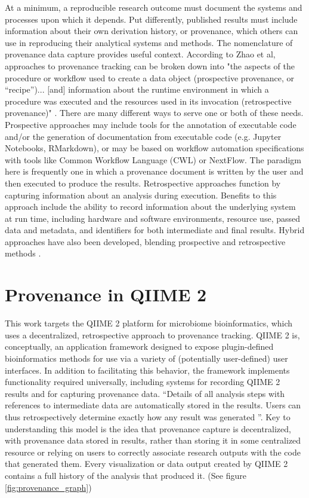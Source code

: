 At a minimum, a reproducible research outcome must document the systems and
processes upon which it depends. Put differently, published results must include
information about their own derivation history, or provenance, which others can
use in reproducing their analytical systems and methods. The nomenclature of
provenance data capture provides useful context. According to Zhao et al,
approaches to provenance tracking can be broken down into "the aspects of the
procedure or workflow used to create a data object (prospective provenance, or
“recipe”)... [and] information about the runtime environment in which a
procedure was executed and the resources used in its invocation (retrospective
provenance)" \parencite[149]{hutchison_applying_2006}. There are many different ways
to serve one or both of these needs. Prospective approaches may include tools
for the annotation of executable code and/or the generation of documentation
from executable code (e.g. Jupyter Notebooks, RMarkdown), or may be based on
workflow automation specifications with tools like Common Workflow Language
(CWL) or NextFlow. The paradigm here is frequently one in which a provenance
document is written by the user and then executed to produce the results.
Retrospective approaches function by capturing information about an analysis
during execution. Benefits to this approach include the ability to record
information about the underlying system at run time, including hardware and
software environments, resource use, passed data and metadata, and identifiers
for both intermediate and final results. Hybrid approaches have also been
developed, blending prospective and retrospective methods \parencite{zhang_revealing_2017}.

\section{Provenance in QIIME 2}

This work targets the QIIME 2 platform for microbiome bioinformatics, which
uses a decentralized, retrospective approach to provenance tracking. QIIME 2 is,
conceptually, an application framework designed to expose plugin-defined
bioinformatics methods for use via a variety of (potentially user-defined) user
interfaces. In addition to facilitating this behavior, the framework implements
functionality required universally, including systems for recording QIIME 2
results and for capturing provenance data. “Details of all analysis steps with
references to intermediate data are automatically stored in the results. Users
can thus retrospectively determine exactly how any result was generated \parencite[854]{bolyen_reproducible_2019}”.
Key to understanding this model is the idea that provenance capture is
decentralized, with provenance data stored in results, rather than storing it in
some centralized resource or relying on users to correctly associate research
outputs with the code that generated them. Every visualization or data output
created by QIIME 2 contains a full history of the analysis that produced it.
(See figure \ref{fig:provenance_graph})

